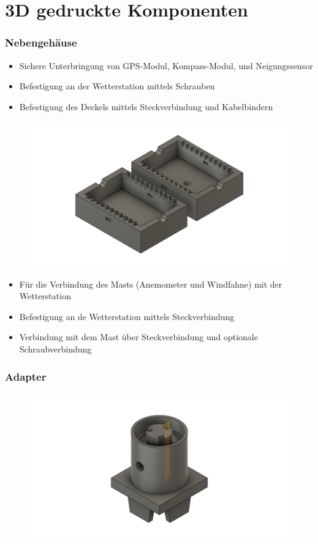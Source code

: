 \documentclass{beamer}
\begin{document}
\section{3D gedruckte Komponenten}
\begin{frame}
  \frametitle{Nebengehäuse}
  \begin{itemize}
  \item Sichere Unterbringung von GPS-Modul, Kompass-Modul, und Neigungssensor
  \item Befestigung an der Wetterstation mittels Schrauben
  \item Befestigung des Deckels mittels Steckverbindung und Kabelbindern
  \end{itemize}
  \begin{figure}[H]
    \centering \includegraphics[width=.7\textwidth]{./img/ST_Halterv5}
  \end{figure}
\end{frame}
\begin{frame}
  \begin{itemize}
  \item Für die Verbindung des Masts (Anemometer und Windfahne) mit der Wetterstation
  \item Befestigung an de Wetterstation mittels Steckverbindung
  \item Verbindung mit dem Mast über Steckverbindung und optionale Schraubverbindung
  \end{itemize}
  \frametitle{Adapter}
  \begin{figure}[H]
    \centering \includegraphics[width=.7\textwidth]{./img/ST_Adapterv4}
  \end{figure}
\end{frame}
\end{document}
